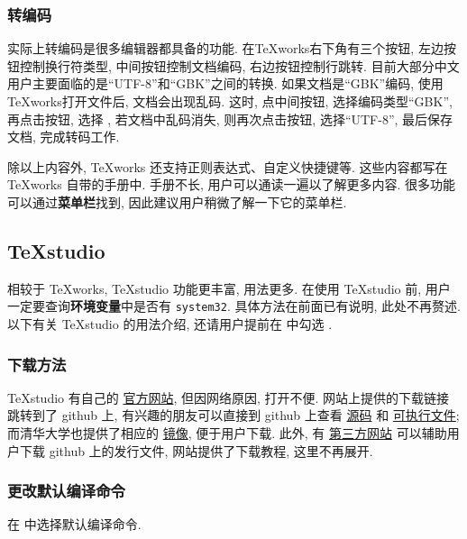 \subsubsection{转编码}

实际上转编码是很多编辑器都具备的功能. 
在\TeX works右下角有三个按钮,
左边按钮控制换行符类型, 中间按钮控制文档编码, 右边按钮控制行跳转. 
目前大部分中文用户主要面临的是``UTF-8''和``GBK''之间的转换. 
如果文档是``GBK''编码, 使用\TeX works打开文件后, 文档会出现乱码. 
这时, 点中间按钮, 选择编码类型``GBK'', 再点击按钮,
选择 , 若文档中乱码消失, 则再次点击按钮,
选择``UTF-8'', 最后保存文档, 完成转码工作. 

除以上内容外, \TeX works 还支持正则表达式、自定义快捷键等. 
这些内容都写在 \TeX works 自带的手册中. 
手册不长, 用户可以通读一遍以了解更多内容.
很多功能可以通过\textbf{菜单栏}找到,
因此建议用户稍微了解一下它的菜单栏.

\subsection{\TeX studio}

相较于 \TeX works, \TeX studio 功能更丰富, 用法更多.
在使用 \TeX studio 前,
用户一定要查询\textbf{环境变量}中是否有 \texttt{system32}.
具体方法在前面已有说明, 此处不再赘述.
以下有关 \TeX studio 的用法介绍,
还请用户提前在  中勾选
.

\subsubsection{下载方法}

\TeX studio 有自己的%
\href{http://texstudio.sourceforge.net/}{官方网站},
但因网络原因,
打开不便.
网站上提供的下载链接跳转到了 github 上,
有兴趣的朋友可以直接到 github 上查看%
\href{https://github.com/texstudio-org/texstudio}{源码}%
和%
\href{https://github.com/texstudio-org/texstudio/releases}{可执行文件};
而清华大学也提供了相应的%
\href{https://mirrors.tuna.tsinghua.edu.cn/github-release/texstudio-org/texstudio/LatestRelease/}{镜像},
便于用户下载.
此外,
有%
\href{https://d.serctl.com}{第三方网站}%
可以辅助用户下载 github 上的发行文件,
网站提供了下载教程,
这里不再展开.

\subsubsection{更改默认编译命令}

在 
中选择默认编译命令. 

